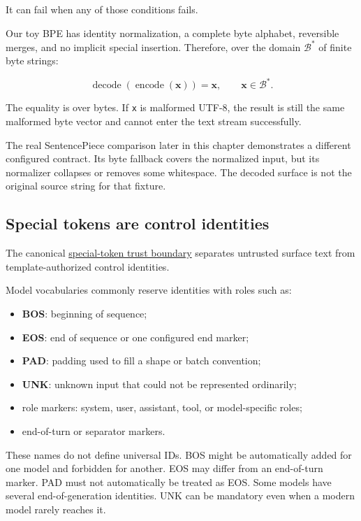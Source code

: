 \documentclass[
  10pt,
]{article}
\providecommand{\tightlist}{%
  \setlength{\itemsep}{0pt}\setlength{\parskip}{0pt}}
\begin{document}
It can fail when any of those conditions fails.

Our toy BPE has identity normalization, a complete byte alphabet,
reversible merges, and no implicit special insertion. Therefore, over
the domain \(\mathcal{B}^{*}\) of finite byte strings:

\[
\operatorname{decode}(\operatorname{encode}(\mathbf{x}))=\mathbf{x},
\qquad \mathbf{x}\in\mathcal{B}^{*}.
\]

The equality is over bytes. If \texttt{x} is malformed UTF-8, the result
is still the same malformed byte vector and cannot enter the text stream
successfully.

The real SentencePiece comparison later in this chapter demonstrates a
different configured contract. Its byte fallback covers the normalized
input, but its normalizer collapses or removes some whitespace. The
decoded surface is not the original source string for that fixture.

\subsection{Special tokens are control
identities}\label{special-tokens-are-control-identities}

The canonical
\href{https://github.com/hermonai/inside-the-llm-engine/blob/astra-visual-rewrite/diagrams/tokenizer/special-token-trust-boundary.txt}{special-token
trust boundary} separates untrusted surface text from
template-authorized control identities.

Model vocabularies commonly reserve identities with roles such as:

\begin{itemize}
\tightlist
\item
  \textbf{BOS}: beginning of sequence;
\item
  \textbf{EOS}: end of sequence or one configured end marker;
\item
  \textbf{PAD}: padding used to fill a shape or batch convention;
\item
  \textbf{UNK}: unknown input that could not be represented ordinarily;
\item
  role markers: system, user, assistant, tool, or model-specific roles;
\item
  end-of-turn or separator markers.
\end{itemize}

These names do not define universal IDs. BOS might be automatically
added for one model and forbidden for another. EOS may differ from an
end-of-turn marker. PAD must not automatically be treated as EOS. Some
models have several end-of-generation identities. UNK can be mandatory
even when a modern model rarely reaches it.
\end{document}
